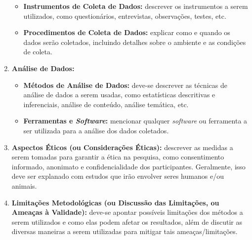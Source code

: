 \begin{enumerate}[label=\roman*., nosep, leftmargin=2.3cm]
\begin{itemize}[nosep]
            \item \textbf{Instrumentos de Coleta de Dados:} descrever os instrumentos a serem utilizados, como questionários, entrevistas, observações, testes, etc.
            \item \textbf{Procedimentos de Coleta de Dados:} explicar como e quando os dados serão coletados, incluindo detalhes sobre o ambiente e as condições de coleta.
        \end{itemize}
    \item \textbf{Análise de Dados:}
        \begin{itemize}[nosep]
            \item \textbf{Métodos de Análise de Dados:} deve-se descrever as técnicas de análise de dados a serem usadas, como estatísticas descritivas e inferenciais, análise de conteúdo, análise temática, etc.
            \item \textbf{Ferramentas e \textit{Software}:} mencionar qualquer \textit{software} ou ferramenta a ser utilizada para a análise dos dados coletados.
        \end{itemize}
    \item \textbf{Aspectos Éticos (ou Considerações Éticas):} descrever as medidas a serem tomadas para garantir a ética na pesquisa, como consentimento informado, anonimato e confidencialidade dos participantes. Geralmente, isso deve ser explanado com estudos que irão envolver seres humanos e/ou animais.
    \item \textbf{Limitações Metodológicas (ou Discussão das Limitações, ou Ameaças à Validade):} deve-se apontar possíveis limitações dos métodos a serem utilizados e como elas podem afetar os resultados, além de discutir as diversas maneiras a serem utilizadas para mitigar tais ameaças/limitações.
\end{enumerate}